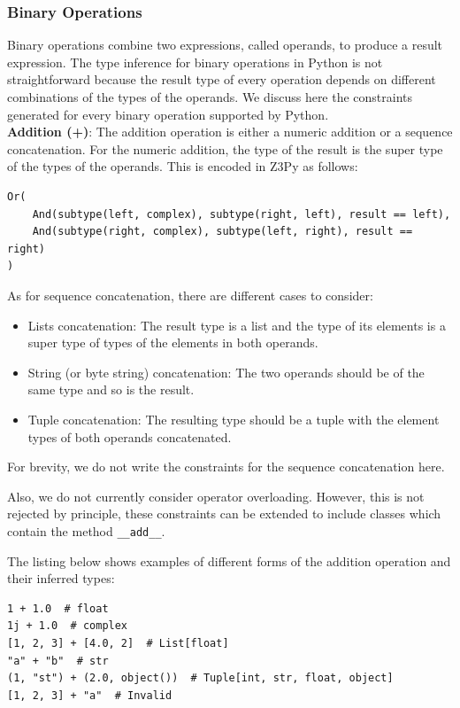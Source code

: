 \subsubsection{Binary Operations}
Binary operations combine two expressions, called operands, to produce a result expression. The type inference for binary operations in Python is not straightforward because the result type of every operation depends on different combinations of the types of the operands. We discuss here the constraints generated for every binary operation supported by Python.\\

\textbf{Addition (+)}:
The addition operation is either a numeric addition or a sequence concatenation. For the numeric addition, the type of the result is the super type of the types of the operands. This is encoded in Z3Py as follows:

\begin{lstlisting}
Or(
	And(subtype(left, complex), subtype(right, left), result == left),
	And(subtype(right, complex), subtype(left, right), result == right)
)
\end{lstlisting}

As for sequence concatenation, there are different cases to consider:

\begin{itemize}
	\item Lists concatenation: The result type is a list and the type of its elements is a super type of types of the elements in both operands.
	\item String (or byte string) concatenation: The two operands should be of the same type and so is the result.
	\item Tuple concatenation: The resulting type should be a tuple with the element types of both operands concatenated.
\end{itemize}

For brevity, we do not write the constraints for the sequence concatenation here.

Also, we do not currently consider operator overloading. However, this is not rejected by principle, these constraints can be extended to include classes which contain the method \lstinline|__add__|.

The listing below shows examples of different forms of the addition operation and their inferred types:

\begin{lstlisting}
1 + 1.0  # float
1j + 1.0  # complex
[1, 2, 3] + [4.0, 2]  # List[float]
"a" + "b"  # str
(1, "st") + (2.0, object())  # Tuple[int, str, float, object]
[1, 2, 3] + "a"  # Invalid
\end{lstlisting}

